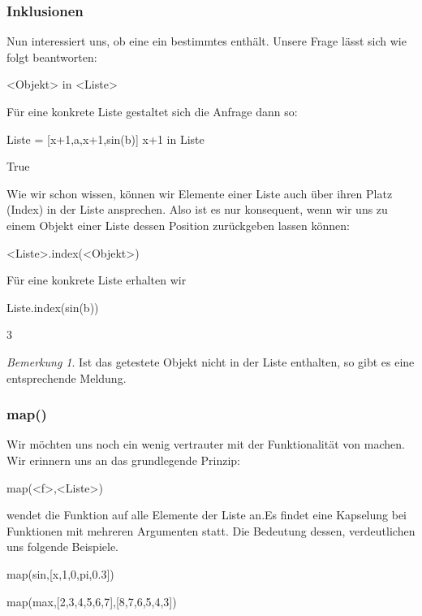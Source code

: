 \documentclass[fontsize=12pt,paper=a4,twoside,bibtotoc,idxtotoc,
liststotoc,pagesize,BCOR1.2cm,DIV15,chapterprefix,pagesize=pdftex]{scrbook}
\theoremstyle{plain}
\theoremstyle{definition}
\theoremstyle{remark}
\newtheorem{bem}[equation]{Bemerkung}
\begin{document}
\subsubsection{Inklusionen}
Nun interessiert uns, ob eine  ein bestimmtes  enthält. Unsere Frage lässt sich wie folgt beantworten:
\begin{sagein}
 <Objekt> in <Liste>
\end{sagein}
Für eine konkrete Liste gestaltet sich die Anfrage dann so:
\begin{sagein}
Liste = [x+1,a,x+1,sin(b)]
x+1 in Liste
\end{sagein}
\begin{sageout}
  True
\end{sageout}
Wie wir schon wissen, können wir Elemente einer Liste auch über ihren Platz (Index) in der Liste ansprechen. Also ist es nur konsequent, wenn wir uns zu einem Objekt einer Liste 
dessen Position zurückgeben lassen können:
\begin{sagein}
 <Liste>.index(<Objekt>)
\end{sagein}
Für eine konkrete Liste erhalten wir
\begin{sagein}
Liste.index(sin(b))
\end{sagein}
\begin{sageout}
  3
\end{sageout}
\begin{bem}
 Ist das getestete Objekt nicht in der Liste enthalten, so gibt es eine entsprechende Meldung.
\end{bem}
\subsubsection{map()} 
Wir möchten uns noch ein wenig vertrauter mit der Funktionalität von  machen. Wir erinnern uns an das grundlegende Prinzip:
\begin{sagein}
 map(<f>,<Liste>)
\end{sagein}
 wendet die Funktion  auf alle Elemente der Liste  an.Es findet eine Kapselung bei Funktionen mit mehreren Argumenten statt. Die Bedeutung dessen, 
verdeutlichen uns folgende Beispiele.
\begin{sagein}
map(sin,[x,1,0,pi,0.3])
\end{sagein}
\begin{sageout}
\end{sageout}
\begin{sagein}
map(max,[2,3,4,5,6,7],[8,7,6,5,4,3])
\end{sagein}
\begin{sageout}
[8, 7, 6, 5, 6, 7]
\end{sageout}
\end{document}

